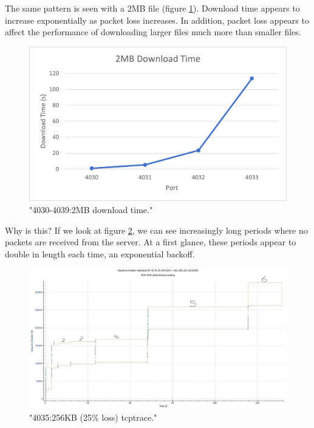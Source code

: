 \documentclass[12pt]{article}
\begin{document}
The same pattern is seen with a 2MB file (figure \ref{figure11: 4030-4039:2MB download time}).
Download time appears to increase exponentially as packet loss increases.
In addition, packet loss appears to affect the performance of downloading larger files much more than smaller files.

\begin{figure}[!htbp]
  \centering
  \includegraphics[width=\linewidth]{4030-4039-2MB-download-time.png}
  \caption{"4030-4039:2MB download time."}
  \label{figure11: 4030-4039:2MB download time}
\end{figure}

Why is this?
If we look at figure \ref{figure12: 4035:256KB tcptrace}, we can see increasingly long periods where no packets are received from the server.
At a first glance, these periods appear to double in length each time, an exponential backoff.

\begin{figure}[!htbp]
  \centering
  \includegraphics[width=\linewidth]{4035-256KB-tcptrace.jpg}
  \caption{"4035:256KB (25\% loss) tcptrace."}
  \label{figure12: 4035:256KB tcptrace}
\end{figure}
\end{document}
